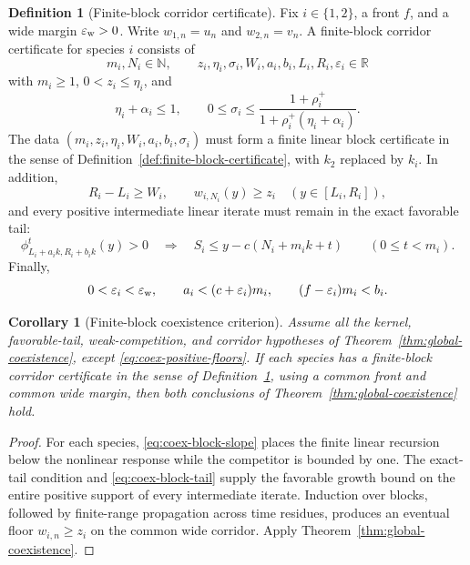 \documentclass[11pt]{article}
\newtheorem{corollary}[theorem]{Corollary}
\theoremstyle{definition}
\newtheorem{definition}[theorem]{Definition}
\newcommand{\R}{\mathbb R}
\newcommand{\N}{\mathbb N}
\begin{document}
\begin{definition}[Finite-block corridor certificate]
\label{def:coex-block-certificate}
Fix \(i\in\{1,2\}\), a front \(f\), and a wide margin
\(\varepsilon_{\rm w}>0\).  Write \(w_{1,n}=u_n\) and \(w_{2,n}=v_n\).
A finite-block corridor certificate for species \(i\) consists of
\[
  m_i,N_i\in\N,\qquad
  z_i,\eta_i,\sigma_i,W_i,a_i,b_i,L_i,R_i,
  \varepsilon_i\in\R
\]
with \(m_i\geq1\), \(0<z_i\leq\eta_i\), and
\begin{equation}\label{eq:coex-block-slope}
  \eta_i+\alpha_i\leq1,
  \qquad
  0\leq\sigma_i\leq
  \frac{1+\rho_i^+}
       {1+\rho_i^+(\eta_i+\alpha_i)}.
\end{equation}
The data \((m_i,z_i,\eta_i,W_i,a_i,b_i,\sigma_i)\) must form a finite
linear block certificate in the sense of
Definition~\ref{def:finite-block-certificate}, with \(k_2\) replaced by
\(k_i\).  In addition,
\begin{equation}\label{eq:coex-block-seed}
  R_i-L_i\geq W_i,
  \qquad
  w_{i,N_i}(y)\geq z_i\quad(y\in[L_i,R_i]),
\end{equation}
and every positive intermediate linear iterate must remain in the exact
favorable tail:
\begin{equation}\label{eq:coex-block-tail}
  \phi_{L_i+a_i k,R_i+b_i k}^{t}(y)>0
  \quad\Longrightarrow\quad
  S_i\leq y-c(N_i+m_i k+t)
  \qquad(0\leq t<m_i).
\end{equation}
Finally,
\begin{equation}\label{eq:coex-block-speeds}
  0<\varepsilon_i<\varepsilon_{\rm w},
  \qquad
  a_i<(c+\varepsilon_i)m_i,
  \qquad
  (f-\varepsilon_i)m_i<b_i.
\end{equation}
\end{definition}

\begin{corollary}[Finite-block coexistence criterion]
\label{cor:coexistence-block}
Assume all the kernel, favorable-tail, weak-competition, and corridor
hypotheses of Theorem~\ref{thm:global-coexistence}, except
\eqref{eq:coex-positive-floors}.  If each species has a finite-block corridor
certificate in the sense of
Definition~\ref{def:coex-block-certificate}, using a common front and common
wide margin, then both conclusions of
Theorem~\ref{thm:global-coexistence} hold.
\end{corollary}

\begin{proof}
For each species, \eqref{eq:coex-block-slope} places the finite linear
recursion below the nonlinear response while the competitor is bounded by
one.  The exact-tail condition and \eqref{eq:coex-block-tail} supply the
favorable growth bound on the entire positive support of every intermediate
iterate.  Induction over blocks, followed by finite-range propagation across
time residues, produces an eventual floor \(w_{i,n}\geq z_i\) on the common
wide corridor.  Apply Theorem~\ref{thm:global-coexistence}.
\end{proof}
\end{document}
